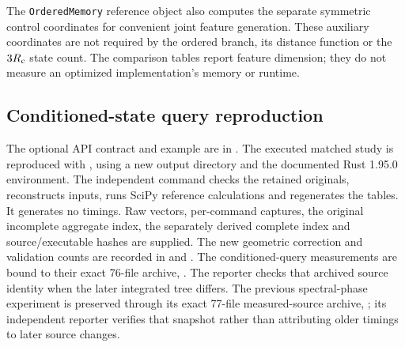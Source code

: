 \documentclass[11pt,a4paper]{article}
\theoremstyle{definition}\newtheorem{definition}[theorem]{Definition}
\begin{document}
The \texttt{OrderedMemory} reference object also computes the separate symmetric control coordinates for convenient joint feature generation. These auxiliary coordinates are not required by the ordered branch, its distance function or the $3R_{\rm c}$ state count. The comparison tables report feature dimension; they do not measure an optimized implementation's memory or runtime.

\subsection{Conditioned-state query reproduction}\label{sec:conditionedreproduction}
The optional API contract and example are in . The executed matched study is reproduced with , using a new output directory and the documented Rust 1.95.0 environment. The independent command  checks the retained originals, reconstructs inputs, runs SciPy reference calculations and regenerates the tables. It generates no timings. Raw vectors, per-command captures, the original incomplete aggregate index, the separately derived complete index and source/executable hashes are supplied. The new geometric correction and validation counts are recorded in  and . The conditioned-query measurements are bound to their exact 76-file archive, . The reporter checks that archived source identity when the later integrated tree differs. The previous spectral-phase experiment is preserved through its exact 77-file measured-source archive, ; its independent reporter verifies that snapshot rather than attributing older timings to later source changes.
\end{document}
